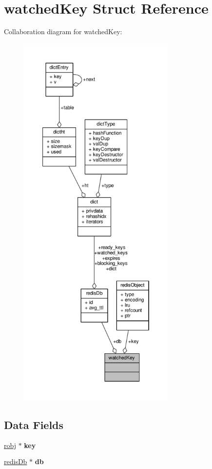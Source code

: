 \hypertarget{structwatchedKey}{}\section{watched\+Key Struct Reference}
\label{structwatchedKey}


Collaboration diagram for watched\+Key\+:\nopagebreak
\begin{figure}[H]
\begin{center}
\leavevmode
\includegraphics[height=550pt]{structwatchedKey__coll__graph}
\end{center}
\end{figure}
\subsection*{Data Fields}
\begin{DoxyCompactItemize}
\item 
\mbox{\label{structwatchedKey_aeafb4ff00bb0d53a76e8c9c52571b6ec}} 
\hyperlink{structredisObject}{robj} $\ast$ {\bfseries key}
\item 
\mbox{\label{structwatchedKey_a10a35ac40a4c595671089ad304a03695}} 
\hyperlink{structredisDb}{redis\+Db} $\ast$ {\bfseries db}
\end{DoxyCompactItemize}


